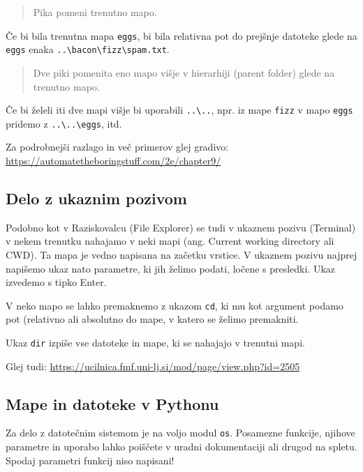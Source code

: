 \documentclass[
]{report}
\begin{document}
\begin{quote}
Pika pomeni trenutno mapo.
\end{quote}

Če bi bila trenutna mapa \texttt{eggs}, bi bila relativna pot do prejšnje datoteke
glede na \texttt{eggs} enaka \texttt{..\textbackslash{}bacon\textbackslash{}fizz\textbackslash{}spam.txt}.

\begin{quote}
Dve piki pomenita eno mapo višje v hierarhiji (parent folder) glede na trenutno mapo.
\end{quote}

Če bi želeli iti dve mapi višje bi uporabili \texttt{..\textbackslash{}..}, npr. iz mape
\texttt{fizz} v mapo \texttt{eggs} pridemo z \texttt{..\textbackslash{}..\textbackslash{}eggs}, itd.

Za podrobnejši razlago in več primerov glej gradivo: \url{https://automatetheboringstuff.com/2e/chapter9/}

\hypertarget{delo-z-ukaznim-pozivom}{%
\subsection{Delo z ukaznim pozivom}\label{delo-z-ukaznim-pozivom}}

Podobno kot v Raziskovalcu (File Explorer) se tudi v ukaznem pozivu (Terminal) v
nekem trenutku nahajamo v neki mapi (ang. Current working directory ali CWD).
Ta mapa je vedno napisana na začetku vrstice. V ukaznem pozivu najprej napišemo ukaz nato parametre, ki jih želimo podati, ločene s presledki. Ukaz izvedemo s tipko Enter.

V neko mapo se lahko premaknemo z ukazom \texttt{cd}, ki mu kot argument podamo pot
(relativno ali absolutno do mape, v katero se želimo premakniti.

Ukaz \texttt{dir} izpiše vse datoteke in mape, ki se nahajajo v trenutni mapi.

Glej tudi: \url{https://ucilnica.fmf.uni-lj.si/mod/page/view.php?id=2505}

\hypertarget{mape-in-datoteke-v-pythonu}{%
\subsection{Mape in datoteke v Pythonu}\label{mape-in-datoteke-v-pythonu}}

Za delo z datotečnim sistemom je na voljo modul \texttt{os}.
Posamezne funkcije, njihove parametre in uporabo lahko poiščete v uradni
dokumentaciji ali drugod na spletu. Spodaj parametri funkcij niso napisani!
\end{document}
